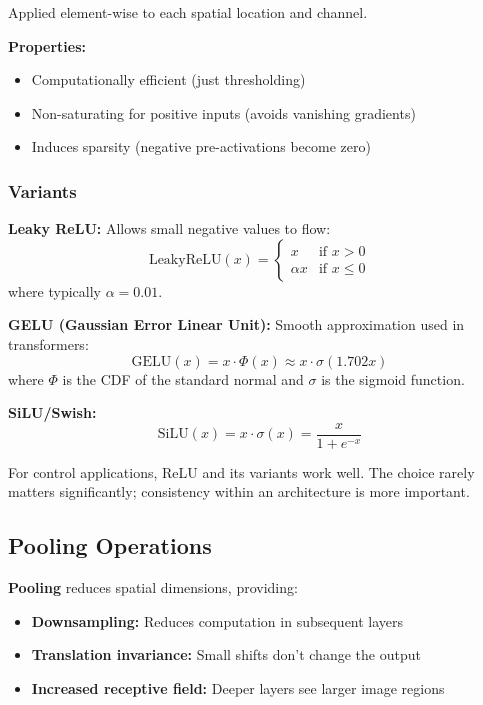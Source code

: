 Applied element-wise to each spatial location and channel.

\textbf{Properties:}
\begin{itemize}
    \item Computationally efficient (just thresholding)
    \item Non-saturating for positive inputs (avoids vanishing gradients)
    \item Induces sparsity (negative pre-activations become zero)
\end{itemize}

\subsubsection{Variants}

\textbf{Leaky ReLU:} Allows small negative values to flow:
\begin{equation}
\text{LeakyReLU}(x) = \begin{cases} x & \text{if } x > 0 \\ \alpha x & \text{if } x \leq 0 \end{cases}
\end{equation}
where typically $\alpha = 0.01$.

\textbf{GELU (Gaussian Error Linear Unit):} Smooth approximation used in transformers:
\begin{equation}
\text{GELU}(x) = x \cdot \Phi(x) \approx x \cdot \sigma(1.702x)
\end{equation}
where $\Phi$ is the CDF of the standard normal and $\sigma$ is the sigmoid function.

\textbf{SiLU/Swish:}
\begin{equation}
\text{SiLU}(x) = x \cdot \sigma(x) = \frac{x}{1 + e^{-x}}
\end{equation}

For control applications, ReLU and its variants work well. The choice rarely matters significantly; consistency within an architecture is more important.

\subsection{Pooling Operations}

\textbf{Pooling} reduces spatial dimensions, providing:
\begin{itemize}
    \item \textbf{Downsampling:} Reduces computation in subsequent layers
    \item \textbf{Translation invariance:} Small shifts don't change the output
    \item \textbf{Increased receptive field:} Deeper layers see larger image regions
\end{itemize}

